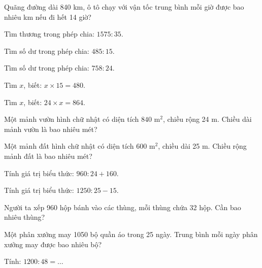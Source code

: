 \begin{ex}
Quãng đường dài 840 km, ô tô chạy với vận tốc trung bình mỗi giờ được bao nhiêu km nếu đi hết 14 giờ?
\end{ex}

\begin{ex}
Tìm thương trong phép chia: $1575 : 35$.
\end{ex}

\begin{ex}
Tìm số dư trong phép chia: $485 : 15$.
\end{ex}

\begin{ex}
Tìm số dư trong phép chia: $758 : 24$.
\end{ex}

\begin{ex}
Tìm $x$, biết: $x \times 15 = 480$.
\end{ex}

\begin{ex}
Tìm $x$, biết: $24 \times x = 864$.
\end{ex}

\begin{ex}
Một mảnh vườn hình chữ nhật có diện tích $840\text{ m}^2$, chiều rộng 24 m. Chiều dài mảnh vườn là bao nhiêu mét?
\end{ex}

\begin{ex}
Một mảnh đất hình chữ nhật có diện tích $600\text{ m}^2$, chiều dài 25 m. Chiều rộng mảnh đất là bao nhiêu mét?
\end{ex}

\begin{ex}
Tính giá trị biểu thức: $960 : 24 + 160$.
\end{ex}

\begin{ex}
Tính giá trị biểu thức: $1250 : 25 - 15$.
\end{ex}

\begin{ex}
Người ta xếp 960 hộp bánh vào các thùng, mỗi thùng chứa 32 hộp. Cần bao nhiêu thùng?
\end{ex}

\begin{ex}
Một phân xưởng may 1050 bộ quần áo trong 25 ngày. Trung bình mỗi ngày phân xưởng may được bao nhiêu bộ?
\end{ex}

\begin{ex}
Tính: $1200 : 48 = \dots$
\end{ex}
